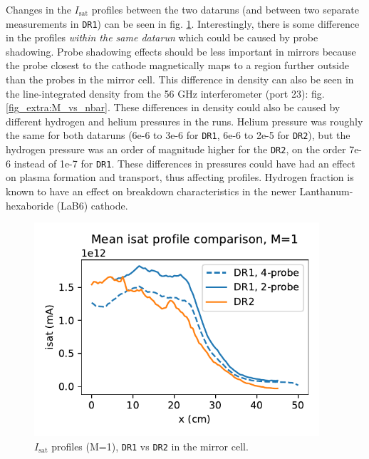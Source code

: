 Changes in the $I_\text{sat}$ profiles between the two dataruns (and between two separate measurements in \texttt{DR1}) can be seen in fig. \ref{fig_extra:DR1-DR2_isat_profile_comparison}. Interestingly, there is some difference in the profiles \emph{within the same datarun} which could be caused by probe shadowing. Probe shadowing effects should be less important in mirrors because the probe closest to the cathode magnetically maps to a region further outside than the probes in the mirror cell. This difference in density can also be seen in the line-integrated density from the 56 GHz interferometer (port 23): fig. \ref{fig_extra:M_vs_nbar}. These differences in density could also be caused by different hydrogen and helium pressures in the runs. Helium pressure was roughly the same for both dataruns (6e-6 to 3e-6 for \texttt{DR1}, 6e-6 to 2e-5 for \texttt{DR2}), but the hydrogen pressure was an order of magnitude higher for the \texttt{DR2}, on the order 7e-6 instead of 1e-7 for \texttt{DR1}. These differences in pressures could have had an effect on plasma formation and transport, thus affecting profiles. Hydrogen fraction is known to have an effect on breakdown characteristics in the newer Lanthanum-hexaboride (LaB6) cathode.
\begin{figure}
    \centering
    \includegraphics[width=300pt]{figures/extra/isat_profile_comparison.pdf}
    \caption[$I_\text{sat}$ profiles (M=1), \texttt{DR1} vs \texttt{DR2}]{$I_\text{sat}$ profiles (M=1), \texttt{DR1} vs \texttt{DR2} in the mirror cell.}
    \label{fig_extra:DR1-DR2_isat_profile_comparison}
\end{figure}

